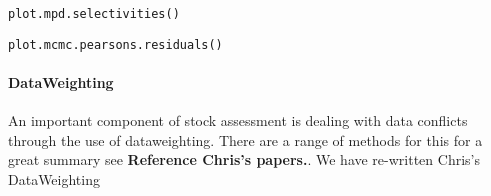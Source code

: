 \texttt{plot.mpd.selectivities()}


\texttt{plot.mcmc.pearsons.residuals()}


\paragraph*{DataWeighting}
An important component of stock assessment is dealing with data conflicts through the use of dataweighting. There are a range of methods for this for a great summary see \textbf{Reference Chris's papers.}. We have re-written Chris's DataWeighting

